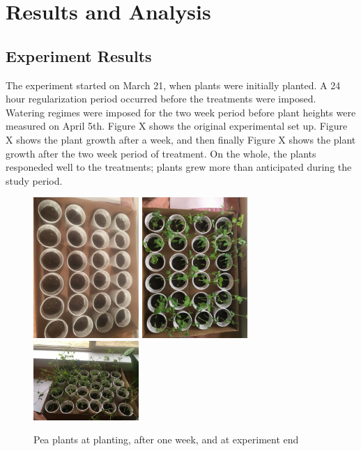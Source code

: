 \documentclass[1p,12pt]{elsarticle}\usepackage[]{graphicx}\usepackage[]{color}
\begin{document}
\section{Results and Analysis}
\subsection{Experiment Results}

The experiment started on March 21, when plants were initially planted. A 24 hour regularization period occurred before the treatments were imposed. Watering regimes were imposed for the two week period before plant heights were measured on April 5th. Figure X shows the original experimental set up. Figure X shows the plant growth after a week, and then finally Figure X shows the plant growth after the two week period of treatment.  On the whole, the plants responeded well to the treatments; plants grew more than anticipated during the study period. 
 \begin{figure}[h!]
 	\caption{Pea plants at planting, after one week, and at experiment end}
 	\centering
	\includegraphics[width = 4cm]{figure/initial_growth.JPG}
	\includegraphics[width = 4cm]{figure/lategrowth.JPG}
	\includegraphics[width = 4cm]{figure/2weeks.JPG}
\end{figure}
\end{document}
